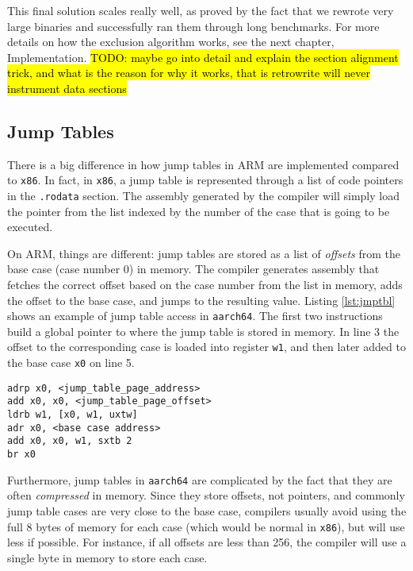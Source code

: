 \documentclass[a4paper,11pt,oneside]{report}
\newcommand{\todo}[1]{%
	\begingroup 
	\sethlcolor{cyan}%
	\hl{TODO: #1}%
	\endgroup
}
\begin{document}
This final solution scales really well, as proved by the fact that we rewrote 
very large binaries and successfully ran them through long benchmarks. For more 
details on how the exclusion algorithm works, see the next chapter, 
Implementation.  \todo{ maybe go into detail and explain the section alignment 
trick, and what is the reason for why it works, that is retrowrite will never 
instrument data sections}


\subsection{Jump Tables}
There is a big difference in how jump tables in ARM are implemented compared to 
\texttt{x86}. In fact, in \texttt{x86}, a jump table is represented through a 
list of code pointers in the \texttt{.rodata} section. The assembly generated 
by the compiler will simply load the pointer from the list indexed by the 
number of the case that is going to be executed. 

On ARM, things are different: jump tables are stored as a list of 
\emph{offsets} from the base case (case number 0) in memory. The compiler 
generates assembly that fetches the correct offset based on the case number 
from the list in memory, adds the offset to the base case, and jumps to the 
resulting value. Listing \ref{lst:jmptbl} shows an example of jump table access 
in \texttt{aarch64}. The first two instructions build a global pointer to where 
the jump table is stored in memory. In line 3 the offset to the corresponding 
case is loaded into register \texttt{w1}, and then later added to the base case 
\texttt{x0} on line 5. 


\begin{lstlisting}[label={lst:jmptbl},caption={Example of a jump table in \texttt{aarch64}}]
adrp x0, <jump_table_page_address>
add x0, x0, <jump_table_page_offset>
ldrb w1, [x0, w1, uxtw]
adr x0, <base case address>
add x0, x0, w1, sxtb 2
br x0
\end{lstlisting}

Furthermore, jump tables in \texttt{aarch64} are complicated by the fact that 
they are often \emph{compressed} in memory. Since they store offsets, not 
pointers, and commonly jump table cases are very close to the base case, 
compilers usually avoid using the full 8 bytes of memory for each case (which 
would be normal in \texttt{x86}), but will use less if possible. For instance, 
if all offsets are less than 256, the compiler will use a single byte in memory 
to store each case.  
\end{document}
